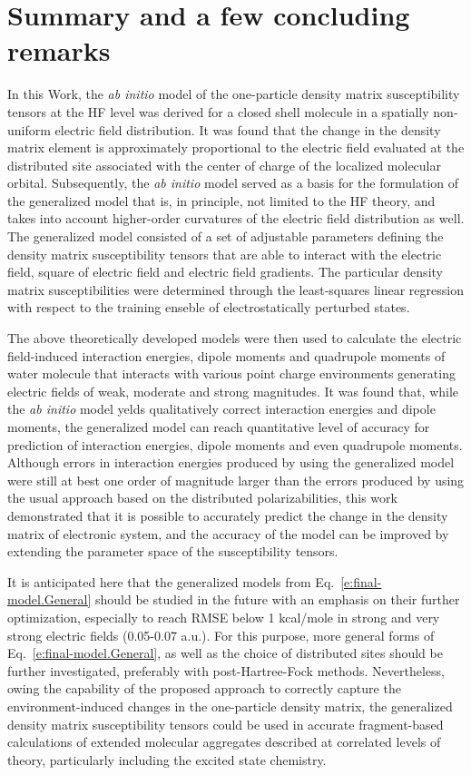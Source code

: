 \documentclass[aip,amsmath,amssymb,reprint,floatfix]{revtex4-1}
\begin{document}
\section{\label{s:5}Summary and a few concluding remarks}

In this Work, the \emph{ab initio} model of the one\hyp{}particle density matrix susceptibility tensors
at the HF level was derived for a closed shell molecule in a spatially non\hyp{}uniform
electric field distribution. It was found that the change in the density matrix element
is approximately proportional to the electric field evaluated at the distributed site associated with the 
center of charge of the 
localized molecular orbital. Subsequently, the \emph{ab initio} model served as a basis
for the formulation of the generalized model that is, in principle, not limited to the HF theory,
and takes into account higher\hyp{}order curvatures of the electric field distribution as well.
The generalized model consisted of a set of adjustable parameters defining the density matrix susceptibility tensors
that are able to interact with the electric field, square of electric field and electric field gradients.
The particular density matrix susceptibilities were determined through the least\hyp{}squares 
linear regression with respect to the training enseble of electrostatically perturbed states.

The above theoretically developed models were then used to calculate the electric field\hyp{}induced
interaction energies, dipole moments and quadrupole moments of water molecule that
interacts with various point charge environments generating electric fields of weak, moderate
and strong magnitudes. It was found that, while the \emph{ab initio} model yelds qualitatively correct
interaction energies and dipole moments, the generalized model can reach quantitative level of accuracy
for prediction of interaction energies, dipole moments and even quadrupole moments. Although 
errors in interaction energies produced by using the generalized model 
were still at best one order of magnitude larger than the errors produced by using the
usual approach based on the distributed polarizabilities, this work demonstrated that it is possible to
accurately predict the change in the density matrix of electronic system, and the accuracy of the model
can be improved by extending the parameter space of the susceptibility tensors. 

It is anticipated here that the generalized models from Eq.~\eqref{e:final-model.General}
should be studied in the future with an emphasis 
on their further optimization, especially to reach RMSE below 1 kcal/mole
in strong and very strong electric fields (0.05-0.07 a.u.). 
For this purpose, more general forms of Eq.~\eqref{e:final-model.General}, as well as the choice of distributed
sites should be further investigated, preferably with post\hyp{}Hartree\hyp{}Fock methods.
Nevertheless, owing the capability of the proposed approach to correctly capture the 
environment\hyp{}induced changes in the one\hyp{}particle density matrix, 
the generalized density matrix susceptibility tensors 
could be used in accurate fragment\hyp{}based calculations of extended molecular aggregates
described at correlated levels of theory, particularly including the excited state chemistry.
\end{document}
